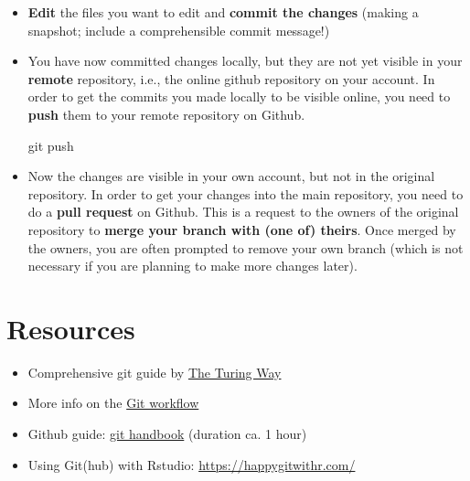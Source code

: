 \documentclass[
  letterpaper,
  DIV=11,
  numbers=noendperiod,
  oneside]{scrreprt}
\newenvironment{Shaded}{\begin{snugshade}}{\end{snugshade}}
\newcommand{\FunctionTok}[1]{\textcolor[rgb]{0.28,0.35,0.67}{#1}}
\newcommand{\NormalTok}[1]{\textcolor[rgb]{0.00,0.23,0.31}{#1}}
\providecommand{\tightlist}{%
  \setlength{\itemsep}{0pt}\setlength{\parskip}{0pt}}
\begin{document}
\begin{tcolorbox}
\begin{itemize}
\begin{Shaded}
\begin{Highlighting}[]
\FunctionTok{git}\NormalTok{ clone git@github.com:username/repositoryname.git}
\end{Highlighting}
\end{Shaded}
\item
  \textbf{Edit} the files you want to edit and \textbf{commit the
  changes} (making a snapshot; include a comprehensible commit message!)
\item
  You have now committed changes locally, but they are not yet visible
  in your \textbf{remote} repository, i.e., the online github repository
  on your account. In order to get the commits you made locally to be
  visible online, you need to \textbf{push} them to your remote
  repository on Github.

\begin{Shaded}
\begin{Highlighting}[]
\FunctionTok{git}\NormalTok{ push}
\end{Highlighting}
\end{Shaded}
\item
  Now the changes are visible in your own account, but not in the
  original repository. In order to get your changes into the main
  repository, you need to do a \textbf{pull request} on Github. This is
  a request to the owners of the original repository to \textbf{merge
  your branch with (one of) theirs}. Once merged by the owners, you are
  often prompted to remove your own branch (which is not necessary if
  you are planning to make more changes later).
\end{itemize}

\section{Resources}\label{resources}

\begin{itemize}
\tightlist
\item
  Comprehensive git guide by
  \href{https://book.the-turing-way.org/reproducible-research/vcs/vcs-git.html}{The
  Turing Way}
\item
  More info on the \href{https://githowto.com/}{Git workflow}
\item
  Github guide:
  \href{https://guides.github.com/introduction/git-handbook/}{git
  handbook} (duration ca. 1 hour)
\item
  Using Git(hub) with Rstudio: \url{https://happygitwithr.com/}
\end{itemize}


\end{tcolorbox}
\end{document}
